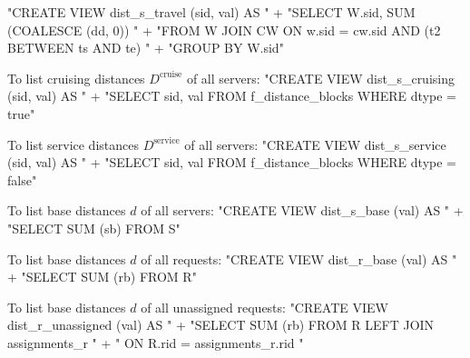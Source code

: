\documentclass{article}
\def\nwendcode{\endtrivlist \endgroup}      %
\let\nwdocspar=\par
\theoremstyle{definition}                   %
\begin{document}
"CREATE VIEW dist_s_travel (sid, val) AS "
  + "SELECT W.sid, SUM (COALESCE (dd, 0)) "
  + "FROM W JOIN CW ON w.sid = cw.sid AND (t2 BETWEEN ts AND te) "
  + "GROUP BY W.sid"
\nwendcode{}\nwdocspar
To list cruising distances $D^\textrm{cruise}$ of all servers:
\nwenddocs{}\endmoddef{}
"CREATE VIEW dist_s_cruising (sid, val) AS "
  + "SELECT sid, val FROM f_distance_blocks WHERE dtype = true"
\nwendcode{}\nwdocspar
To list service distances $D^\textrm{service}$ of all servers:
\nwenddocs{}\endmoddef{}
"CREATE VIEW dist_s_service (sid, val) AS "
  + "SELECT sid, val FROM f_distance_blocks WHERE dtype = false"
\nwendcode{}\nwdocspar
To list base distances $d$ of all servers:
\nwenddocs{}\endmoddef{}
"CREATE VIEW dist_s_base (val) AS "
  + "SELECT SUM (sb) FROM S"
\nwendcode{}\nwdocspar
To list base distances $d$ of all requests:
\nwenddocs{}\endmoddef{}
"CREATE VIEW dist_r_base (val) AS "
  + "SELECT SUM (rb) FROM R"
\nwendcode{}\nwdocspar
To list base distances $d$ of all unassigned requests:
\nwenddocs{}\endmoddef{}
"CREATE VIEW dist_r_unassigned (val) AS "
  + "SELECT SUM (rb) FROM R LEFT JOIN assignments_r "
  + "  ON R.rid = assignments_r.rid "
\end{document}
